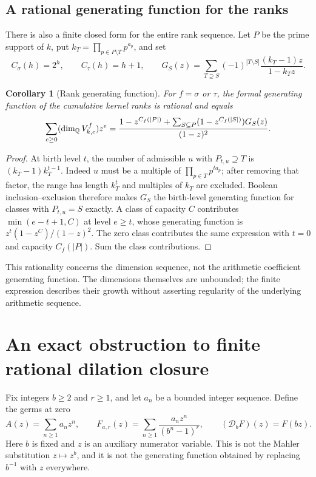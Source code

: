 \documentclass[11pt,a4paper]{article}
\newtheorem{corollary}[theorem]{Corollary}
\theoremstyle{definition}\newtheorem{definition}[theorem]{Definition}
\theoremstyle{remark}\newtheorem*{remark}{Remark}
\begin{document}
\subsection{A rational generating function for the ranks}

There is also a finite closed form for the entire rank sequence. Let $P$ be
 the prime support of $k$, put $k_T=\prod_{p\in P\setminus T}p^{a_p}$, and set
\[
 C_\sigma(h)=2^h,\qquad C_\tau(h)=h+1,\qquad
 G_S(z)=\sum_{T\supseteq S}(-1)^{|T\setminus S|}
                  \frac{(k_T-1)z}{1-k_Tz}.
\]
\begin{corollary}[Rank generating function]\label{cor:rankseries}
For $f=\sigma$ or $\tau$, the formal generating function of the cumulative
kernel ranks is rational and equals
\[
 \sum_{e\ge0}(\dim_\mathbb Q V^f_{k,e})z^e
 =\frac{1-z^{C_f(|P|)}+
       \sum_{S\subseteq P}(1-z^{C_f(|S|)})G_S(z)}{(1-z)^2}.
\]
\end{corollary}
\begin{proof}
At birth level $t$, the number of admissible $u$ with $P_{t,u}\supseteq T$
is $(k_T-1)k_T^{t-1}$. Indeed $u$ must be a multiple of
$\prod_{p\in T}p^{ta_p}$; after removing that factor, the range has length
$k_T^t$ and multiples of $k_T$ are excluded. Boolean inclusion--exclusion
therefore makes $G_S$ the birth-level generating function for classes with
$P_{t,u}=S$ exactly. A class of capacity $C$ contributes
$\min(e-t+1,C)$ at level $e\ge t$, whose generating function is
$z^t(1-z^C)/(1-z)^2$. The zero class contributes the same expression with
$t=0$ and capacity $C_f(|P|)$. Sum the class contributions.
\end{proof}
This rationality concerns the dimension sequence, not the arithmetic
coefficient generating function. The dimensions themselves are unbounded;
the finite expression describes their growth without asserting regularity
of the underlying arithmetic sequence.

\section{An exact obstruction to finite rational dilation closure}\label{sec:dilation}

Fix integers $b\ge2$ and $r\ge1$, and let $a_n$ be a bounded integer sequence.
Define the germs at zero
\[
 A(z)=\sum_{n\ge1}a_nz^n,\qquad
 F_{a,r}(z)=\sum_{n\ge1}\frac{a_nz^n}{(b^n-1)^r},\qquad
 (\mathcal D_bF)(z)=F(bz).
\]
Here $b$ is fixed and $z$ is an auxiliary numerator variable. This is not the
Mahler substitution $z\mapsto z^b$, and it is not the generating function
obtained by replacing $b^{-1}$ with $z$ everywhere.
\end{document}
